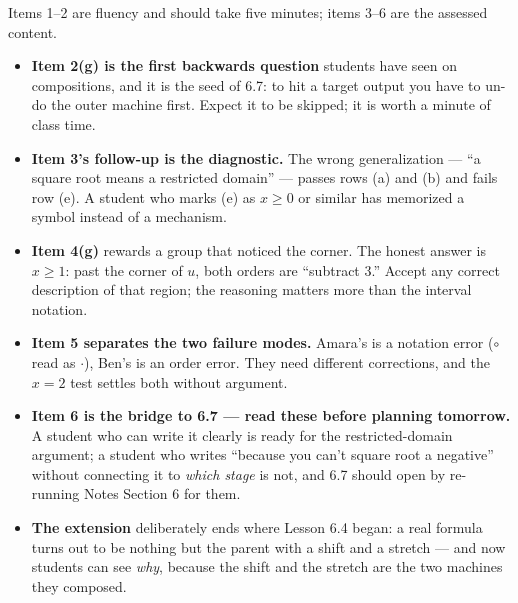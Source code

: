 \documentclass[10pt]{article}
\begin{document}
\begin{teachernote}
\small Items 1--2 are fluency and should take five minutes; items 3--6 are the assessed content.
\begin{itemize}[leftmargin=1.3em, nosep]
  \item \textbf{Item 2(g) is the first backwards question} students have seen on compositions, and
        it is the seed of 6.7: to hit a target output you have to un-do the outer machine first.
        Expect it to be skipped; it is worth a minute of class time.
  \item \textbf{Item 3's follow-up is the diagnostic.} The wrong generalization ---
        ``a square root means a restricted domain'' --- passes rows (a) and (b) and fails row (e).
        A student who marks (e) as $x\ge0$ or similar has memorized a symbol instead of a mechanism.
  \item \textbf{Item 4(g)} rewards a group that noticed the corner. The honest answer is $x\ge1$:
        past the corner of $u$, both orders are ``subtract $3$.'' Accept any correct description of
        that region; the reasoning matters more than the interval notation.
  \item \textbf{Item 5 separates the two failure modes.} Amara's is a notation error ($\circ$ read
        as $\cdot$), Ben's is an order error. They need different corrections, and the $x=2$ test
        settles both without argument.
  \item \textbf{Item 6 is the bridge to 6.7 --- read these before planning tomorrow.} A student who
        can write it clearly is ready for the restricted-domain argument; a student who writes
        ``because you can't square root a negative'' without connecting it to \emph{which stage} is
        not, and 6.7 should open by re-running Notes Section 6 for them.
  \item \textbf{The extension} deliberately ends where Lesson 6.4 began: a real formula turns out to
        be nothing but the parent with a shift and a stretch --- and now students can see \emph{why},
        because the shift and the stretch are the two machines they composed.
\end{itemize}
\end{teachernote}
\end{document}
